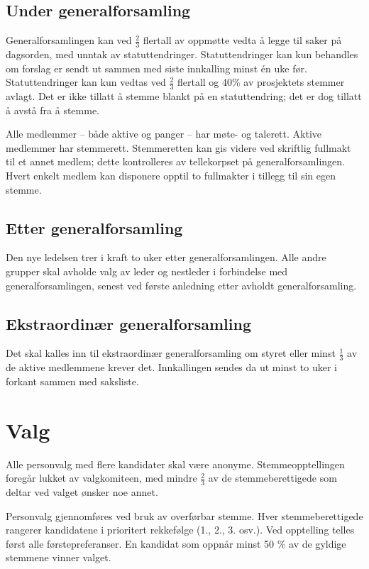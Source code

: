 \subsection{Under generalforsamling}\label{sec:generalforsamling:under}
Generalforsamlingen kan ved $\frac{2}{3}$ flertall av oppmøtte vedta å legge til saker på dagsorden, med unntak av statuttendringer.
Statuttendringer kan kun behandles om forslag er sendt ut sammen med siste innkalling minst én uke før.
Statuttendringer kan kun vedtas ved $\frac{2}{3}$ flertall og 40\% av prosjektets stemmer avlagt.
Det er ikke tillatt å stemme blankt på en statuttendring; det er dog tillatt å avstå fra å stemme.

Alle medlemmer -- både aktive og panger -- har møte- og talerett.
Aktive medlemmer har stemmerett.
Stemmeretten kan gis videre ved skriftlig fullmakt til et annet medlem; dette kontrolleres av tellekorpset på generalforsamlingen.
Hvert enkelt medlem kan disponere opptil to fullmakter i tillegg til sin egen stemme.

\subsection{Etter generalforsamling}\label{sec:generalforsamling:etter}
Den nye ledelsen trer i kraft to uker etter generalforsamlingen.
Alle andre grupper skal avholde valg av leder og nestleder i forbindelse med generalforsamlingen, senest ved første anledning etter avholdt generalforsamling.

\subsection{Ekstraordinær generalforsamling}\label{sec:generalforsamling:ekstraordinær}
Det skal kalles inn til ekstraordinær generalforsamling om styret eller minst $\frac{1}{3}$ av de aktive medlemmene krever det.
Innkallingen sendes da ut minst to uker i forkant sammen med saksliste.


\section{Valg}\label{sec:valg}
Alle personvalg med flere kandidater skal være anonyme.
Stemmeopptellingen foregår lukket av valgkomiteen, med mindre $\frac{2}{3}$ av de stemmeberettigede som deltar ved valget ønsker noe annet.

Personvalg gjennomføres ved bruk av overførbar stemme.
Hver stemmeberettigede rangerer kandidatene i prioritert rekkefølge (1., 2., 3. osv.).
Ved opptelling telles først alle førstepreferanser.
En kandidat som oppnår minst 50 \% av de gyldige stemmene vinner valget.

